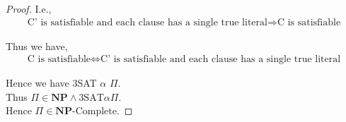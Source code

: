 \documentclass[12pt]{article}
\newenvironment{question}[2][Question]{\begin{trivlist}
\item[\hskip \labelsep {\bfseries #1}\hskip \labelsep {\bfseries #2.}]}{\end{trivlist}}
\begin{document}
\begin{question}{1}
\begin{proof}
    I.e.,
    \begin{align*}
      \text{C' is satisfiable and each clause has a single true literal} \Rightarrow \text{C is satisfiable}
    \end{align*}

    Thus we have,
    \begin{align*}
      \text{C is satisfiable} \iff \text{C' is satisfiable and each clause has a single true literal}
    \end{align*}

    Hence we have 3SAT $\alpha$ $\Pi$. \\
    Thus $\Pi \in \textbf{NP} \land \text{3SAT} \alpha \Pi$. \\
    Hence $\Pi \in \textbf{NP-}\text{Complete}$.
  \end{proof}
\end{question}
\end{document}

